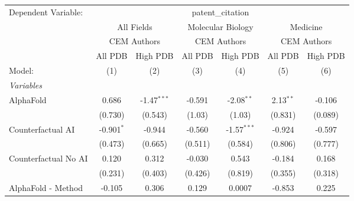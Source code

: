 \begingroup
\centering
\begin{tabular}{lcccccc}
   \tabularnewline \midrule \midrule
   Dependent Variable: & \multicolumn{6}{c}{patent\_citation}\\
 & \multicolumn{2}{c}{All Fields} & \multicolumn{2}{c}{Molecular Biology} & \multicolumn{2}{c}{Medicine} \\
\cmidrule(lr){2-3} \cmidrule(lr){4-5} \cmidrule(lr){6-7}
 & \multicolumn{2}{c}{CEM Authors} & \multicolumn{2}{c}{CEM Authors} & \multicolumn{2}{c}{CEM Authors} \\
\cmidrule(lr){2-3} \cmidrule(lr){4-5} \cmidrule(lr){6-7}
 & \multicolumn{1}{c}{All PDB} & \multicolumn{1}{c}{High PDB} & \multicolumn{1}{c}{All PDB} & \multicolumn{1}{c}{High PDB} & \multicolumn{1}{c}{All PDB} & \multicolumn{1}{c}{High PDB} \\
\cmidrule(lr){2-2} \cmidrule(lr){3-3} \cmidrule(lr){4-4} \cmidrule(lr){5-5} \cmidrule(lr){6-6} \cmidrule(lr){7-7}
   Model:                                                     & (1)           & (2)           & (3)           & (4)           & (5)           & (6)\\  
   \midrule
   \emph{Variables}\\
   AlphaFold                                                  & 0.686         & -1.47$^{***}$ & -0.591        & -2.08$^{**}$  & 2.13$^{**}$   & -0.106\\   
                                                              & (0.730)       & (0.543)       & (1.03)        & (1.03)        & (0.831)       & (0.089)\\   
   Counterfactual AI                                          & -0.901$^{*}$  & -0.944        & -0.560        & -1.57$^{***}$ & -0.924        & -0.597\\   
                                                              & (0.473)       & (0.665)       & (0.511)       & (0.584)       & (0.806)       & (0.777)\\   
   Counterfactual No AI                                       & 0.120         & 0.312         & -0.030        & 0.543         & -0.184        & 0.168\\   
                                                              & (0.231)       & (0.403)       & (0.426)       & (0.819)       & (0.355)       & (0.318)\\   
   AlphaFold - Method                                         & -0.105        & 0.306         & 0.129         & 0.0007        & -0.853        & 0.225\\   

\end{tabular}
